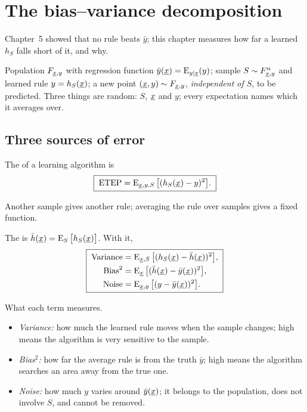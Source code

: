 \chapter{The bias--variance decomposition}

Chapter~5 showed that no rule beats $\bar y$; this chapter measures how far a learned $h_S$ falls short of it, and why.

\begin{setup}
Population $F_{\underline{x},y}$ with regression function $\bar y(\underline{x})=\operatorname{E}_{y\mid\underline{x}}(y)$; sample $S\sim F^n_{\underline{x},y}$ and learned rule $y=h_S(\underline{x})$; a new point $(\underline{x},y)\sim F_{\underline{x},y}$, \emph{independent of $S$}, to be predicted. Three things are random: $S$, $\underline{x}$ and $y$; every expectation names which it averages over.
\end{setup}

\section{Three sources of error}

\begin{definition}
The  of a learning algorithm is
\[
  \boxed{\;\text{ETEP}=\operatorname{E}_{\underline{x},y,S}\big[(h_S(\underline{x})-y)^2\big].\;}
\]
\end{definition}

Another sample gives another rule; averaging the rule over samples gives a fixed function.

\begin{definition}
The  is $\bar h(\underline{x})=\operatorname{E}_S\big[h_S(\underline{x})\big]$. With it,
\[
  \boxed{\;\begin{aligned}
    \text{Variance}&=\operatorname{E}_{\underline{x},S}\big[(h_S(\underline{x})-\bar h(\underline{x}))^2\big],\\
    \text{Bias}^2&=\operatorname{E}_{\underline{x}}\big[(\bar h(\underline{x})-\bar y(\underline{x}))^2\big],\\
    \text{Noise}&=\operatorname{E}_{\underline{x},y}\big[(y-\bar y(\underline{x}))^2\big].
  \end{aligned}\;}
\]
\end{definition}

What each term measures.
\begin{itemize}
  \item \emph{Variance:} how much the learned rule moves when the sample changes; high means the algorithm is very sensitive to the sample.
  \item \emph{Bias$^2$:} how far the average rule is from the truth $\bar y$; high means the algorithm searches an area away from the true one.
  \item \emph{Noise:} how much $y$ varies around $\bar y(\underline{x})$; it belongs to the population, does not involve $S$, and cannot be removed.
\end{itemize}

